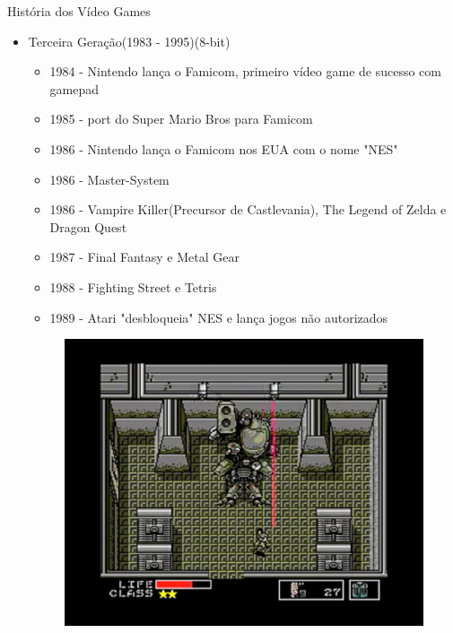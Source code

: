 \documentclass[xcolor=svgnames,handout]{beamer}
\begin{document}
\begin{frame}{História dos Vídeo Games}
\begin{itemize}
	\item Terceira Geração(1983 - 1995)(8-bit)\pause
	\begin{itemize}
	\item 1984 - Nintendo lança o Famicom, primeiro vídeo game de sucesso com gamepad\pause
	\item 1985 - port do Super Mario Bros para Famicom\pause
	\item 1986 - Nintendo lança o Famicom nos EUA com o nome "NES"\pause
	\item 1986 - Master-System\pause
	\item 1986 - Vampire Killer(Precursor de Castlevania), The Legend of Zelda e Dragon Quest\pause
	\item 1987 - Final Fantasy e Metal Gear\pause
	\item 1988 - Fighting Street e Tetris\pause
	\item 1989 - Atari "desbloqueia" NES e lança jogos não autorizados
	\end{itemize}
		\begin{figure}[t]
	    \centering
		    \includegraphics[scale=0.1]{imagens/metal-gear}
		\end{figure}
\end{itemize}
\end{frame}
\end{document}
